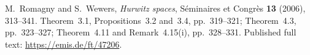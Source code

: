 M.~Romagny and S.~Wewers,
\emph{Hurwitz spaces}, S\'eminaires et Congr\`es \textbf{13} (2006),
313--341.  Theorem~3.1, Propositions~3.2 and~3.4, pp.~319--321;
Theorem~4.3, pp.~323--327; Theorem~4.11 and Remark~4.15(i),
pp.~328--331.  Published full text: \url{https://emis.de/ft/47206}.

